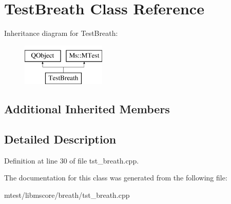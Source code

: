 \hypertarget{class_test_breath}{}\section{Test\+Breath Class Reference}
\label{class_test_breath}
Inheritance diagram for Test\+Breath\+:\begin{figure}[H]
\begin{center}
\leavevmode
\includegraphics[height=2.000000cm]{class_test_breath}
\end{center}
\end{figure}
\subsection*{Additional Inherited Members}


\subsection{Detailed Description}


Definition at line 30 of file tst\+\_\+breath.\+cpp.



The documentation for this class was generated from the following file\+:\begin{DoxyCompactItemize}
\item 
mtest/libmscore/breath/tst\+\_\+breath.\+cpp\end{DoxyCompactItemize}
